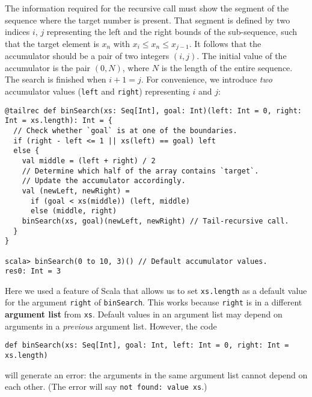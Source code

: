 The information required for the recursive call must show the segment
of the sequence where the target number is present. That segment is
defined by two indices $i$, $j$ representing the left and the right
bounds of the sub-sequence, such that the target element is $x_{n}$
with $x_{i}\leq x_{n}\leq x_{j-1}$. It follows that the accumulator
should be a pair of two integers $\left(i,j\right)$. The initial
value of the accumulator is the pair $\left(0,N\right)$, where $N$
is the length of the entire sequence. The search is finished when
$i+1=j$. For convenience, we introduce \emph{two} accumulator values
(\lstinline!left! and \lstinline!right!) representing $i$ and $j$:
\begin{lstlisting}
@tailrec def binSearch(xs: Seq[Int], goal: Int)(left: Int = 0, right: Int = xs.length): Int = {
  // Check whether `goal` is at one of the boundaries.
  if (right - left <= 1 || xs(left) == goal) left
  else {
    val middle = (left + right) / 2
    // Determine which half of the array contains `target`.
    // Update the accumulator accordingly.
    val (newLeft, newRight) =
      if (goal < xs(middle)) (left, middle)
      else (middle, right)
    binSearch(xs, goal)(newLeft, newRight) // Tail-recursive call.
  }
}

scala> binSearch(0 to 10, 3)() // Default accumulator values.
res0: Int = 3
\end{lstlisting}
Here we used a feature of Scala that allows us to set \lstinline!xs.length!
as a default value for the argument \lstinline!right! of \lstinline!binSearch!.
This works because \lstinline!right! is in a different \textbf{argument
list} from \lstinline!xs!. Default values in
an argument list may depend on arguments in a \emph{previous} argument
list. However, the code
\begin{lstlisting}
def binSearch(xs: Seq[Int], goal: Int, left: Int = 0, right: Int = xs.length)
\end{lstlisting}
will generate an error: the arguments in the same argument list cannot
depend on each other. (The error will say \lstinline!not found: value xs!.)

